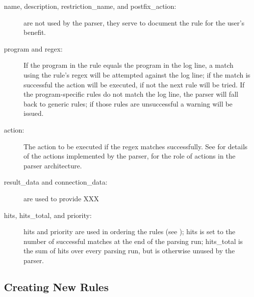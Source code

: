 \begin{description}

    \item [name, description, restriction\_name, and postfix\_action:] are
        not \newline{} used by the parser, they serve to document the rule
        for the user's benefit.

    \item [program and regex:] If the program in the rule equals the
        program in the log line, a match using the rule's regex will be
        attempted against the log line; if the match is successful the
        action will be executed, if not the next rule will be tried.  If
        the program-specific rules do not match the log line, the parser
        will fall back to generic rules; if those rules are unsuccessful a
        warning will be issued.

    \item [action:] The action to be executed if the regex matches
        successfully.  See 
        for details of the actions implemented by the parser,
         for the role of actions in the
        parser architecture.

    \item [result\_data and connection\_data:] are used to provide XXX

    \item [hits, hits\_total, and priority:] hits and priority are used in
        ordering the rules (see );
        hits is set to the number of successful matches at the end of the
        parsing run; hits\_total is the sum of hits over every parsing run,
        but is otherwise unused by the parser.


\end{description}


\subsection{Creating New Rules}

\label{creating new rules in implementation}

